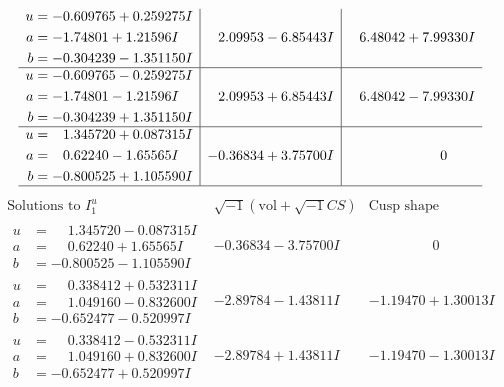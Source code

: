 \documentclass[1p]{elsarticle_modified}
\theoremstyle{definition}
\newcommand{\I}{\sqrt{-1}}
\begin{document}
$$\begin{array}{c|c|c}
\begin{aligned}
u &= -0.609765 + 0.259275 I \\
a &= -1.74801 + 1.21596 I \\
b &= -0.304239 - 1.351150 I\end{aligned}
 & \phantom{-}2.09953 - 6.85443 I & \phantom{-}6.48042 + 7.99330 I \\ \hline\begin{aligned}
u &= -0.609765 - 0.259275 I \\
a &= -1.74801 - 1.21596 I \\
b &= -0.304239 + 1.351150 I\end{aligned}
 & \phantom{-}2.09953 + 6.85443 I & \phantom{-}6.48042 - 7.99330 I \\ \hline\begin{aligned}
u &= \phantom{-}1.345720 + 0.087315 I \\
a &= \phantom{-}0.62240 - 1.65565 I \\
b &= -0.800525 + 1.105590 I\end{aligned}
 & -0.36834 + 3.75700 I & \phantom{-0.000000 } 0\\
 \hline 
 \end{array}$$\newpage$$\begin{array}{c|c|c}  
\text{Solutions to }I^u_{1}& \I (\text{vol} + \sqrt{-1}CS) & \text{Cusp shape}\\
 \hline 
\begin{aligned}
u &= \phantom{-}1.345720 - 0.087315 I \\
a &= \phantom{-}0.62240 + 1.65565 I \\
b &= -0.800525 - 1.105590 I\end{aligned}
 & -0.36834 - 3.75700 I & \phantom{-0.000000 } 0 \\ \hline\begin{aligned}
u &= \phantom{-}0.338412 + 0.532311 I \\
a &= \phantom{-}1.049160 - 0.832600 I \\
b &= -0.652477 - 0.520997 I\end{aligned}
 & -2.89784 - 1.43811 I & -1.19470 + 1.30013 I \\ \hline\begin{aligned}
u &= \phantom{-}0.338412 - 0.532311 I \\
a &= \phantom{-}1.049160 + 0.832600 I \\
b &= -0.652477 + 0.520997 I\end{aligned}
 & -2.89784 + 1.43811 I & -1.19470 - 1.30013 I \\ \hline\begin{aligned}

\end{aligned}
\end{array}$$
\end{document}
